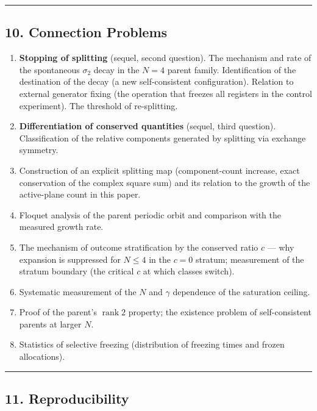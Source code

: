 \documentclass[
  a4paper,
]{article}
\providecommand{\tightlist}{%
  \setlength{\itemsep}{0pt}\setlength{\parskip}{0pt}}
\begin{document}
\begin{center}\rule{0.5\linewidth}{0.5pt}\end{center}

\subsection{10. Connection Problems}\label{connection-problems}

\begin{enumerate}
\def\labelenumi{\arabic{enumi}.}
\tightlist
\item
  \textbf{Stopping of splitting} (sequel, second question). The
  mechanism and rate of the spontaneous \(\sigma_2\) decay in the
  \(N=4\) parent family. Identification of the destination of the decay
  (a new self-consistent configuration). Relation to external generator
  fixing (the operation that freezes all registers in the control
  experiment). The threshold of re-splitting.
\item
  \textbf{Differentiation of conserved quantities} (sequel, third
  question). Classification of the relative components generated by
  splitting via exchange symmetry.
\item
  Construction of an explicit splitting map (component-count increase,
  exact conservation of the complex square sum) and its relation to the
  growth of the active-plane count in this paper.
\item
  Floquet analysis of the parent periodic orbit and comparison with the
  measured growth rate.
\item
  The mechanism of outcome stratification by the conserved ratio \(c\)
  --- why expansion is suppressed for \(N\le4\) in the \(c=0\) stratum;
  measurement of the stratum boundary (the critical \(c\) at which
  classes switch).
\item
  Systematic measurement of the \(N\) and \(\gamma\) dependence of the
  saturation ceiling.
\item
  Proof of the parent's \(\operatorname{rank}2\) property; the existence
  problem of self-consistent parents at larger \(N\).
\item
  Statistics of selective freezing (distribution of freezing times and
  frozen allocations).
\end{enumerate}

\begin{center}\rule{0.5\linewidth}{0.5pt}\end{center}

\subsection{11. Reproducibility}\label{reproducibility}
\end{document}
